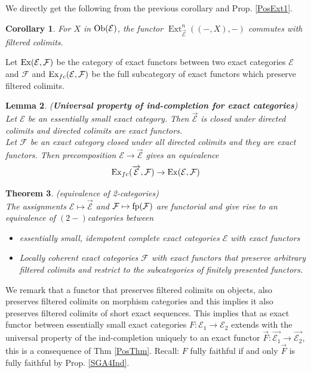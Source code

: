 \documentclass[11pt,a4paper]{amsart}
\theoremstyle{plain}
\newtheorem{thm}{Theorem}[section]
\newtheorem{lem}[thm]{Lemma}
\newtheorem{cor}[thm]{Corollary}
\theoremstyle{definition}
\DeclareMathOperator{\Ext}{Ext}
\newcommand{\mcE}{\mathcal{E}}
\newcommand{\mcF}{\mathcal{F}}
\begin{document}
We directly get the following from the previous corollary and Prop. \ref{PosExt1}. 
\begin{cor} 
For $X$ in ${\rm Ob} (\mcE)$, the functor $\Ext^n_{\overrightarrow{\mcE}}((-,X), -)$ commutes with filtered colimits.     
\end{cor}



Let ${\rm Ex}(\mcE, \mcF)$ be the category of exact functors between two exact categories $\mcE$ and $\mcF$ and ${\rm Ex}_{fc} (\mcE, \mcF)$ be the full subcategory of exact functors which preserve filtered colimits. 
\begin{lem} (\textbf{Universal property of ind-completion for exact categories}) \label{UElocCoh}
Let $\mcE$ be an essentially small exact category. 
Then $\overrightarrow{\mcE}$ is closed under directed colimits and directed colimits are exact functors. \\
Let $\mcF$ be an exact category closed under all directed colimits and they are exact functors. Then precomposition $\mcE\to \overrightarrow{\mcE}$ gives an equivalence
\[{\rm Ex}_{fc} (\overrightarrow{\mcE}, \mcF)\to {\rm Ex} (\mcE, \mcF)\] 
\end{lem}




\begin{thm} (equivalence of 2-categories) \\
The assignments $\mcE\mapsto \overrightarrow{\mcE}$ and $\mcF\mapsto {\rm fp} (\mcF)$ are functorial and give rise to an equivalence of $(2-)$categories between 
\begin{itemize}
\item[(1)] essentially small, idempotent complete exact categories $\mcE$ with exact functors 
\item[(2)] Locally coherent exact categories $\mcF$ with
exact functors that preserve arbitrary filtered colimits and restrict to the subcategories of finitely presented functors. 
\end{itemize}
\end{thm}
We remark that a functor that preserves filtered colimits on objects, also preserves filtered colimits on morphism categories and this implies it also preserves filtered colimits of short exact sequences. This implies that as exact functor between essentially small exact categories $F\colon \mcE_1\to \mcE_2$ extends with the universal property of the ind-completion uniquely to an exact functor $\overrightarrow{F}\colon \overrightarrow{\mcE_1}\to \overrightarrow{\mcE_2}$, this is a consequence of Thm \ref{PosThm}. 
Recall: $F$ fully faithful if and only $\overrightarrow{F}$ is fully faithful by Prop. \ref{SGA4Ind}. 
\end{document}
